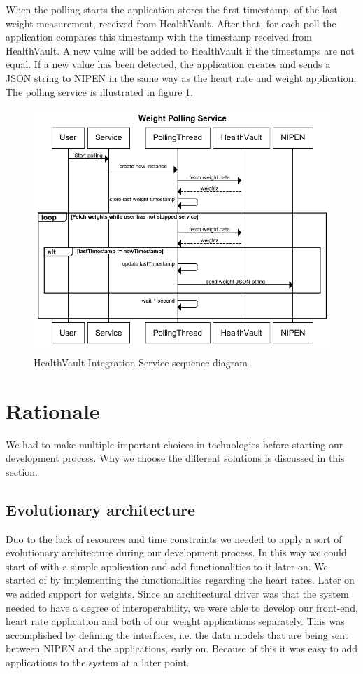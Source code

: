 When the polling starts the application stores the first timestamp, of the last weight measurement, received from HealthVault.
After that, for each poll the application compares this timestamp with the timestamp received from HealthVault.
A new value will be added to HealthVault if the timestamps are not equal.
If a new value has been detected, the application creates and sends a JSON string to NIPEN in the same way as the heart rate and weight application.
The polling service is illustrated in figure \ref{figure:weight-polling-service}.

\begin{figure}[h]
\centering
\includegraphics[scale=0.8]{../Figures/weight-polling-service.png}
\caption{HealthVault Integration Service sequence diagram}
\label{figure:weight-polling-service}
\end{figure}

\section{Rationale}

We had to make multiple important choices in technologies before starting our development process.
Why we choose the different solutions is discussed in this section.

\subsection{Evolutionary architecture}
Duo to the lack of resources and time constraints we needed to apply a sort of evolutionary architecture during our development process.
In this way we could start of with a simple application and add functionalities to it later on.
We started of by implementing the functionalities regarding the heart rates. 
Later on we added support for weights.
Since an architectural driver was that the system needed to have a degree of interoperability, we were able to develop our front-end, heart rate application and both of our weight applications separately.
This was accomplished by defining the interfaces, i.e. the data models that are being sent between NIPEN and the applications, early on.
Because of this it was easy to add applications to the system at a later point.

